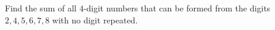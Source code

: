 Find the sum of all $4$-digit numbers that can be formed from the digits $2,4,5,6,7,8$ with no digit repeated.
